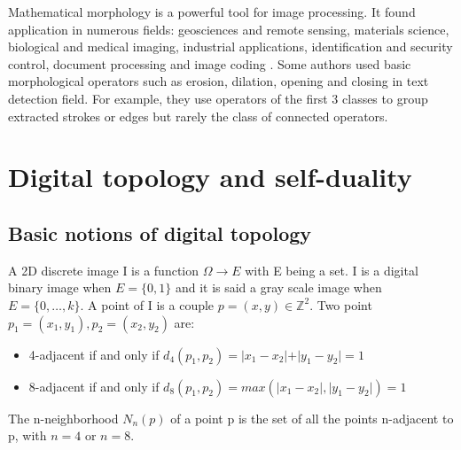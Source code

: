 \par Mathematical morphology is a powerful tool for image processing. It found application in numerous fields: geosciences and remote sensing, materials science, biological and medical imaging, industrial applications, identification and security control, document processing and image coding \cite{Soille:2003:MIA:773286}. Some authors used basic morphological operators such as erosion, dilation, opening and closing in text detection field. For example, they use operators of the first 3 classes to group extracted strokes\cite{Zhang.2015.Neurocomputing} or edges \cite{Ye.2003.ICICS} \cite{Pillai.2013.ICCPCT} but rarely the class of connected operators. 

\section{Digital topology and self-duality}
\subsection{Basic notions of digital topology}
\par
A 2D discrete image I is a function $ \Omega \rightarrow E$ with E being a set. I is a digital binary image when $E = \lbrace0,1\rbrace$ and it is said a gray scale image when $E = \lbrace0, \dots, k\rbrace$. A point of I is a couple $p = (x,y) \in \mathbb{Z}^2$. Two point $p_1 =(x_1,y_1),p_2=(x_2,y_2)$ are:
\begin{itemize}
\item 4-adjacent if and only if $d_4 (p_1,p_2) =\vert x_1 - x_2 \vert + \vert y_1 - y_2 \vert = 1 $
\item 8-adjacent if and only if $d_8 (p_1,p_2) =max (\vert x_1 - x_2 \vert , \vert y_1 - y_2 \vert) = 1 $
\end{itemize}
\par
The n-neighborhood $N_n (p)$ of a point p is the set of all the points n-adjacent to p, with $n = 4$ or $n = 8$.
